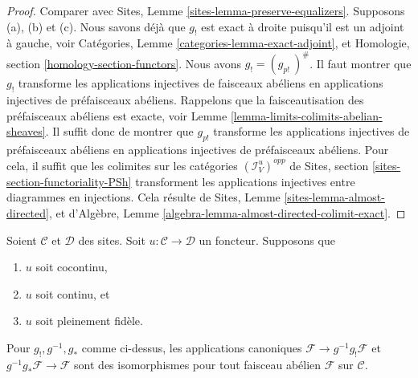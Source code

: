 \begin{proof}
Comparer avec Sites, Lemme \ref{sites-lemma-preserve-equalizers}. Supposons
(a), (b) et (c). Nous savons déjà que $g_!$ est exact à droite puisqu'il est un
adjoint à gauche, voir Catégories, Lemme
\ref{categories-lemma-exact-adjoint}, et Homologie, section
\ref{homology-section-functors}. Nous avons $g_! = (g_{p!}\ )^\#$. Il faut
montrer que $g_!$ transforme les applications injectives de faisceaux abéliens
en applications injectives de préfaisceaux abéliens. Rappelons que la
faisceautisation des préfaisceaux abéliens est exacte, voir Lemme
\ref{lemma-limits-colimits-abelian-sheaves}. Il suffit donc de montrer que
$g_{p!}$ transforme les applications injectives de préfaisceaux abéliens en
applications injectives de préfaisceaux abéliens. Pour cela, il suffit que les
colimites sur les catégories
$(\mathcal{I}_V^u)^{opp}$ de Sites, section
\ref{sites-section-functoriality-PSh}
transforment les applications injectives entre diagrammes en injections. Cela
résulte de Sites, Lemme \ref{sites-lemma-almost-directed}, et d'Algèbre, Lemme
\ref{algebra-lemma-almost-directed-colimit-exact}.
\end{proof}

\begin{lemma}
\label{lemma-back-and-forth}
Soient $\mathcal{C}$ et $\mathcal{D}$ des sites. Soit
$u : \mathcal{C} \to \mathcal{D}$ un foncteur. Supposons que
\begin{enumerate}
\item[(a)] $u$ soit cocontinu,
\item[(b)] $u$ soit continu, et
\item[(c)] $u$ soit pleinement fidèle.
\end{enumerate}
Pour $g_!, g^{-1}, g_*$ comme ci-dessus, les applications canoniques
$\mathcal{F} \to g^{-1}g_!\mathcal{F}$ et
$g^{-1}g_*\mathcal{F} \to \mathcal{F}$
sont des isomorphismes pour tout faisceau abélien $\mathcal{F}$ sur
$\mathcal{C}$.
\end{lemma}

